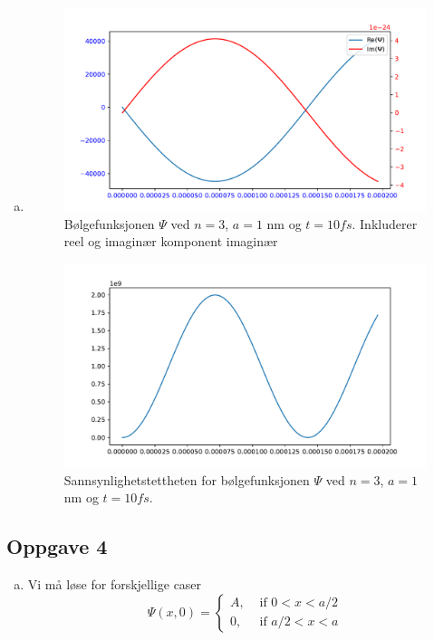 \documentclass{article}
\begin{document}
\begin{enumerate}[a)]
\begin{enumerate}[\bf I.]
    
    \end{enumerate}
    \item 
\begin{figure}[h!]
  \centering
  \includegraphics[width = \textwidth]{fig/3.b.1.pdf}
  \caption{Bølgefunksjonen $Ψ$ ved $n = 3$, $a = 1$ nm og $t = 10 fs$. Inkluderer reel og imaginær komponent imaginær}
  \label{fig: 4.b}
\end{figure}
\begin{figure}[h!]
  \centering
  \includegraphics[width = \textwidth]{fig/3.b.2.pdf}
  \caption{Sannsynlighetstettheten for bølgefunksjonen $Ψ$ ved $n = 3$, $a = 1$ nm og $t = 10 fs$.}
  \label{fig: }
\end{figure}
\end{enumerate}

\newpage \phantom{ }
\newpage
\subsection*{Oppgave 4}
\begin{enumerate}[a)]
    \item 
    Vi må løse for forskjellige caser 
    \[
    Ψ(x,0) = 
    \begin{cases}
      A, &\text{ if }0 < x < a / 2\\
      0, &\text{ if }a / 2 < x < a
    \end{cases}
    \]
\end{enumerate}
\end{document}
